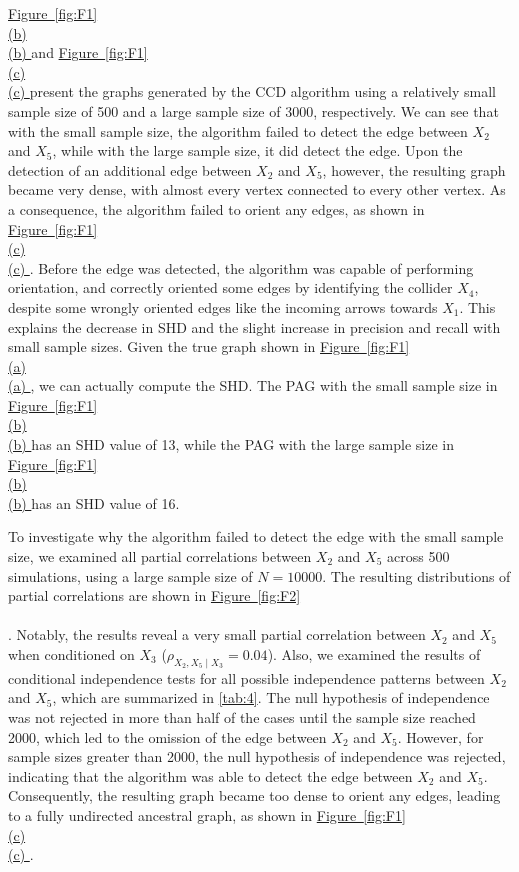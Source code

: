 \documentclass[twoside, 11pt]{article}
\newcommand*{\figref}[2][]{%
  \hyperref[{fig:#2}]{%
    Figure~\ref*{fig:#2}%
    \ifx\\#1\\%
    \else
      #1%
    \fi
  }%
}
\begin{document}
\begin{appendices}
\figref[(b)]{F1} and \figref[(c)]{F1} present the graphs generated by the CCD algorithm using a relatively small sample size of 500 and a large sample size of 3000, respectively. 
We can see that with the small sample size, the algorithm failed to detect the edge between $X_2$ and $X_5$, while with the large sample size, it did detect the edge. 
Upon the detection of an additional edge between $X_2$ and $X_5$, however, the resulting graph became very dense, with almost every vertex connected to every other vertex. As a consequence, the algorithm failed to orient any edges, as shown in \figref[(c)]{F1}. 
Before the edge was detected, the algorithm was capable of performing orientation, and correctly oriented some edges by identifying the collider $X_4$, despite some wrongly oriented edges like the incoming arrows towards $X_1$. This explains the decrease in SHD and the slight increase in precision and recall with small sample sizes. Given the true graph shown in \figref[(a)]{F1}, we can actually compute the SHD. The PAG with the small sample size in \figref[(b)]{F1} has an SHD value of 13, while the PAG with the large sample size in \figref[(b)]{F1} has an SHD value of 16.

To investigate why the algorithm failed to detect the edge with the small sample size, we examined all partial correlations between $X_2$ and $X_5$ across 500 simulations, using a large sample size of $N=10000$. The resulting distributions of partial correlations are shown in \figref[]{F2}. Notably, the results reveal a very small partial correlation between $X_2$ and $X_5$ when conditioned on $X_3$ ($\rho_{X_2, X_5 \mid X_3} = 0.04$). Also, we examined the results of conditional independence tests for all possible independence patterns between $X_2$ and $X_5$, which are summarized in \autoref{tab:4}. 
The null hypothesis of independence was not rejected in more than half of the cases until the sample size reached 2000, which led to the omission of the edge between $X_2$ and $X_5$. However, for sample sizes greater than 2000, the null hypothesis of independence was rejected, indicating that the algorithm was able to detect the edge between $X_2$ and $X_5$. Consequently, the resulting graph became too dense to orient any edges, leading to a fully undirected ancestral graph, as shown in \figref[(c)]{F1}.


\end{appendices}
\end{document}
